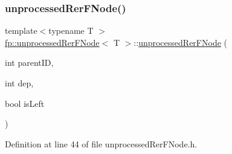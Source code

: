 \subsubsection{\texorpdfstring{unprocessed\+Rer\+F\+Node()}{unprocessedRerFNode()}\hspace{0.1cm}{\footnotesize\ttfamily [2/2]}}
{\footnotesize\ttfamily template$<$typename T $>$ \\
\hyperlink{classfp_1_1unprocessedRerFNode}{fp\+::unprocessed\+Rer\+F\+Node}$<$ T $>$\+::\hyperlink{classfp_1_1unprocessedRerFNode}{unprocessed\+Rer\+F\+Node} (\begin{DoxyParamCaption}\item[{int}]{parent\+ID,  }\item[{int}]{dep,  }\item[{bool}]{is\+Left }\end{DoxyParamCaption})\hspace{0.3cm}{\ttfamily [inline]}}



Definition at line 44 of file unprocessed\+Rer\+F\+Node.\+h.


